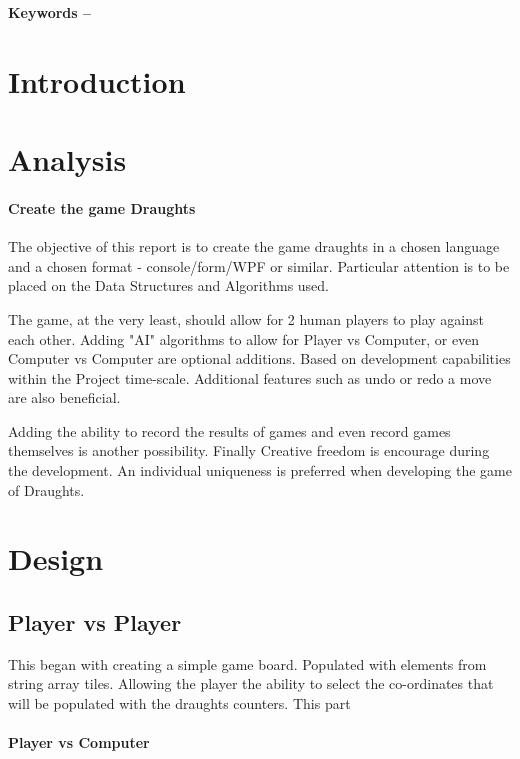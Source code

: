 \documentclass[10pt, a4paper]{article}
\title{\mytitle}
\author{\myauthor\hspace{1em}\\\contact\\Edinburgh Napier University\hspace{0.5em}-\hspace{0.5em}\mymodule}
\date{}
\begin{document}
    \maketitle
    \begin{abstract}
        hello.
    \end{abstract}
    
    \textbf{Keywords -- }{\mykeywords}
    
    \section{Introduction}
    \section{Analysis}
    \paragraph{Create the game Draughts}
    The objective of this report is to create the game draughts in a chosen language and a chosen format - console/form/WPF or similar. Particular attention is to be placed on the Data Structures and Algorithms used.
    
    The game, at the very least, should allow for 2 human players to play against each other. Adding "AI" algorithms to allow for Player vs Computer, or even Computer vs Computer are optional additions. Based on development capabilities within the Project time-scale. Additional features such as undo or redo a move are also beneficial.
    
    Adding the ability to record the results of games and even record games themselves is another possibility. Finally Creative freedom is encourage during the development. An individual uniqueness is preferred when developing the game of Draughts.
    \section{Design}
    \subsection{{Player vs Player}}
    This began with creating a simple game board. Populated with elements from string array tiles. Allowing the player the ability to select the co-ordinates that will be populated with the draughts counters. This part 
    \paragraph{Player vs Computer}
\end{document}
